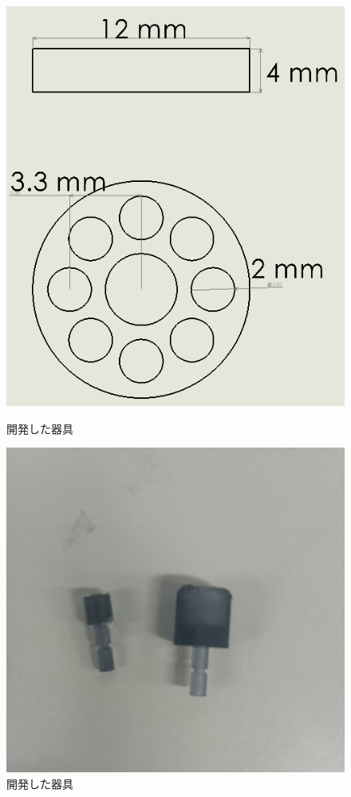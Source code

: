 \begin{figure}[b]
  \centering
  \begin{minipage}{0.49\hsize}
      \centering
      \includegraphics[scale=0.25]{pic/setu.PNG}
      \caption{開発した器具}
      \label{fig:setu}
  \end{minipage} \hfill
  \begin{minipage}{0.49\hsize}
      \centering
      \includegraphics[scale=0.25]{pic/S__157270018.jpg}
      \caption{開発した器具}
      \label{fig:kuro}
  \end{minipage} 
\end{figure}




